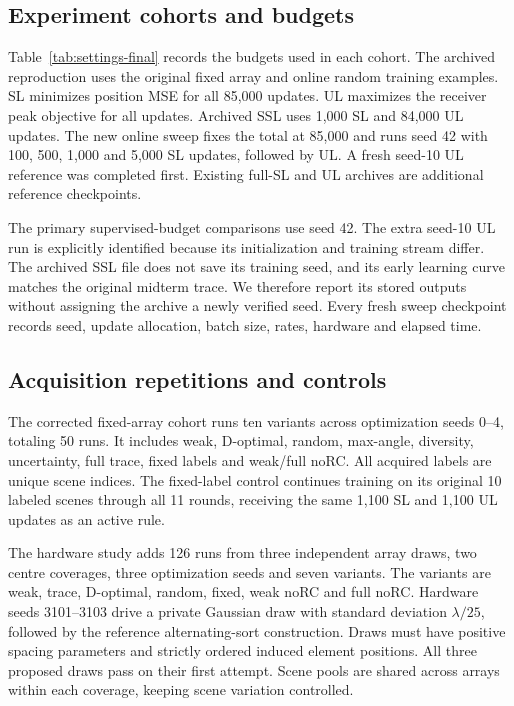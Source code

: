 \documentclass[conference]{IEEEtran}
\begin{document}
\subsection{Experiment cohorts and budgets}
Table~\ref{tab:settings-final} records the budgets used in each cohort. The archived reproduction uses the original fixed array and online random training examples. SL minimizes position MSE for all 85,000 updates. UL maximizes the receiver peak objective for all updates. Archived SSL uses 1,000 SL and 84,000 UL updates. The new online sweep fixes the total at 85,000 and runs seed 42 with 100, 500, 1,000 and 5,000 SL updates, followed by UL. A fresh seed-10 UL reference was completed first. Existing full-SL and UL archives are additional reference checkpoints.

The primary supervised-budget comparisons use seed 42. The extra seed-10 UL run is explicitly identified because its initialization and training stream differ. The archived SSL file does not save its training seed, and its early learning curve matches the original midterm trace. We therefore report its stored outputs without assigning the archive a newly verified seed. Every fresh sweep checkpoint records seed, update allocation, batch size, rates, hardware and elapsed time.

\subsection{Acquisition repetitions and controls}
The corrected fixed-array cohort runs ten variants across optimization seeds 0--4, totaling 50 runs. It includes weak, D-optimal, random, max-angle, diversity, uncertainty, full trace, fixed labels and weak/full noRC. All acquired labels are unique scene indices. The fixed-label control continues training on its original 10 labeled scenes through all 11 rounds, receiving the same 1,100 SL and 1,100 UL updates as an active rule.

The hardware study adds 126 runs from three independent array draws, two centre coverages, three optimization seeds and seven variants. The variants are weak, trace, D-optimal, random, fixed, weak noRC and full noRC. Hardware seeds 3101--3103 drive a private Gaussian draw with standard deviation $\lambda/25$, followed by the reference alternating-sort construction. Draws must have positive spacing parameters and strictly ordered induced element positions. All three proposed draws pass on their first attempt. Scene pools are shared across arrays within each coverage, keeping scene variation controlled.
\end{document}
